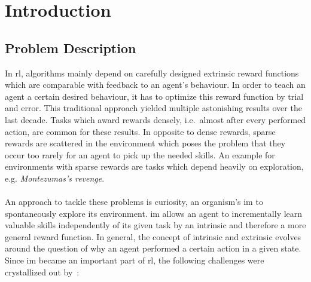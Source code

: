 \documentclass[draft,final]{vutinfth} %
\newcommand{\p}[1]{see p. #1}
\begin{document}
    \begin{kurzfassung}
    \end{kurzfassung}

    \begin{abstract}
    \end{abstract}


    \tableofcontents %

    \mainmatter


    \chapter{Introduction}



    \section{Problem Description}\label{sec:problem-description}
    In \gls{rl}, algorithms mainly depend on carefully designed extrinsic reward functions which are comparable with feedback to an agent's behaviour.
    In order to teach an agent a certain desired behaviour, it has to optimize this reward function by trial and error.
    This traditional approach yielded multiple astonishing results over the last decade.
    Tasks which award rewards densely, i.e.\ almost after every performed action, are common for these results.
    In opposite to dense rewards, sparse rewards are scattered in the environment which poses the problem that they occur too rarely for an agent to pick up the needed skills.
    An example for environments with sparse rewards are tasks which depend heavily on exploration, e.g. \textit{Montezumas's revenge}.
    \\\\
    An approach to tackle these problems is curiosity, an organism's \gls{im} to spontaneously explore its environment.
    \gls{im} allows an agent to incrementally learn valuable skills independently of its given task by an intrinsic and therefore a more general reward function.
    In general, the concept of intrinsic and extrinsic evolves around the question of why an agent performed a certain action in a given state.
    Since \gls{im} became an important part of \gls{rl}, the following challenges were crystallized out by~\cite[\p{6}]{aubret_survey_2019}:
\end{document}
